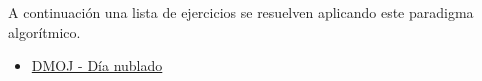 A continuación una lista de ejercicios se resuelven aplicando este paradigma algorítmico.

\begin{itemize}
	\item \href{https://dmoj.uclv.edu.cu/problem/cloundyday}{DMOJ - Día nublado}
\end{itemize}